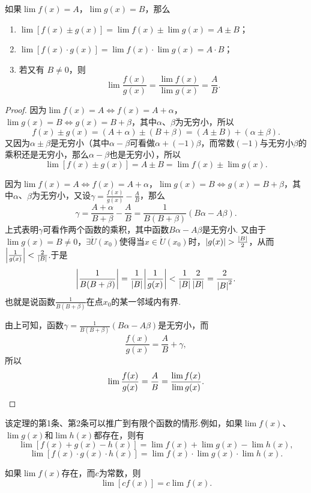 \begin{theorem}\label{theorem:极限.极限的四则运算法则}
如果\(\lim f(x)=A\)，\(\lim g(x)=B\)，那么\begin{enumerate}
\item \(\lim [f(x) \pm g(x)] = \lim f(x) \pm \lim g(x) = A \pm B\)；
\item \(\lim [f(x) \cdot g(x)] = \lim f(x) \cdot \lim g(x) = A \cdot B\)；
\item 若又有 \(B \neq 0\)，则
\[\lim \frac{f(x)}{g(x)} = \frac{\lim f(x)}{\lim g(x)} = \frac{A}{B}.\]
\end{enumerate}
\begin{proof}
因为\(\lim f(x)=A \iff f(x)=A+\alpha\)，\(\lim g(x)=B \iff g(x)=B+\beta\)，其中\(\alpha\)、\(\beta\)为无穷小，所以\[
f(x) \pm g(x) = (A+\alpha)\pm(B+\beta) = (A \pm B) + (\alpha \pm \beta).
\]又因为\(\alpha\pm\beta\)是无穷小（其中\(\alpha-\beta\)可看做\(\alpha+(-1)\beta\)，而常数\((-1)\)与无穷小\(\beta\)的乘积还是无穷小，那么\(\alpha-\beta\)也是无穷小），所以\[
\lim [f(x) \pm g(x)] = A \pm B = \lim f(x) \pm \lim g(x).
\]

因为\(\lim f(x)=A \iff f(x)=A+\alpha\)，\(\lim g(x)=B \iff g(x)=B+\beta\)，其中\(\alpha\)、\(\beta\)为无穷小，又设\(\gamma = \frac{f(x)}{g(x)} - \frac{A}{B}\)，那么\[
\gamma = \frac{A+\alpha}{B+\beta} - \frac{A}{B}
= \frac{1}{B(B+\beta)} (B \alpha - A \beta).
\]上式表明\(\gamma\)可看作两个函数的乘积，其中函数\(B \alpha - A \beta\)是无穷小.
又由于\(\lim g(x) = B \neq 0\)，\(\exists \mathring{U}(x_0)\)使得当\(x\in\mathring{U}(x_0)\)时，\(\abs{g(x)}>\frac{\abs{B}}{2}\)，从而\(\abs{\frac{1}{g(x)}}<\frac{2}{\abs{B}}\).于是\[
\abs{\frac{1}{B(B+\beta)}}
=\frac{1}{\abs{B}} \abs{\frac{1}{g(x)}}
<\frac{1}{\abs{B}} \frac{2}{\abs{B}}
=\frac{2}{\abs{B}^2}.
\]也就是说函数\(\frac{1}{B(B+\beta)}\)在点\(x_0\)的某一邻域内有界.

由上可知，函数\(\gamma = \frac{1}{B(B+\beta)} (B \alpha - A \beta)\)是无穷小，而\[
\frac{f(x)}{g(x)} = \frac{A}{B} + \gamma,
\]所以\[
\lim\frac{f(x)}{g(x)} = \frac{A}{B} = \frac{\lim f(x)}{\lim g(x)}.
\qedhere
\]
\end{proof}
\end{theorem}

该定理的第1条、第2条可以推广到有限个函数的情形.例如，如果\(\lim f(x)\)、\(\lim g(x)\)和\(\lim h(x)\)都存在，则有\[
\lim[f(x) + g(x) - h(x)] = \lim f(x) + \lim g(x) - \lim h(x),
\]\[
\lim[f(x) \cdot g(x) \cdot h(x)] = \lim f(x) \cdot \lim g(x) \cdot \lim h(x).
\]

\begin{corollary}
如果\(\lim f(x)\)存在，而\(c\)为常数，则\[\lim [c f(x)] = c \lim f(x).\]
\end{corollary}

